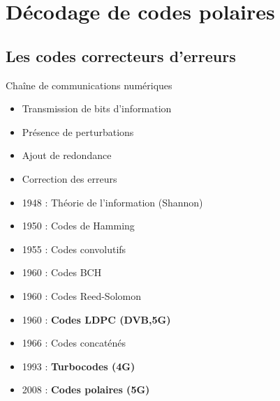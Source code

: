 

\section[Introduction]{Décodage de codes polaires}
\subsection*{Les codes correcteurs d'erreurs}

\begin{frame}[c]{Chaîne de communications numériques}
	\begin{center}
	\end{center}
	\begin{itemize}
		\item<1-> Transmission de bits d'information
		\item<1-> Présence de perturbations
		\item<2-> Ajout de redondance
		\item<4-> Correction des erreurs
	\end{itemize}
\end{frame}

\begin{frame}[c]
	\tableofcontents[
	subsectionstyle=hide,
	]
\end{frame}

\begin{frame}
\vfill
	\begin{itemize}
		\item 1948 : Théorie de l’information (Shannon)
		\item 1950 : Codes de Hamming
		\item 1955 : Codes convolutifs
		\item 1960 : Codes BCH
		\item 1960 : Codes Reed-Solomon
		\item 1960 : \textbf{Codes LDPC (DVB,5G)}
		\item 1966 : Codes concaténés
		\item 1993 : \textbf{Turbocodes (4G)}
		\item 2008 : \textbf{Codes polaires (5G)}
	\end{itemize}
	\vfill
\end{frame}

